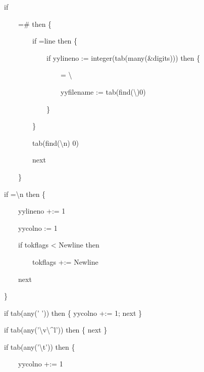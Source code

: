 {\ttfamily\mdseries
\ \ \ \ \ \ \ if }

{\ttfamily\mdseries
\ \ \ \ \ \ \ \ \ \ \ ={\textquotedbl}\#{\textquotedbl} then \{}

{\ttfamily\mdseries
\ \ \ \ \ \ \ \ \ \ \ \ \ \ \ if ={\textquotedbl}line {\textquotedbl} then \{}

{\ttfamily\mdseries
\ \ \ \ \ \ \ \ \ \ \ \ \ \ \ \ \ \ \ if yylineno := integer(tab(many(\&digits))) then \{}

{\ttfamily\mdseries
\ \ \ \ \ \ \ \ \ \ \ \ \ \ \ \ \ \ \ \ \ \ \ ={\textquotedbl} {\textbackslash}{\textquotedbl}{\textquotedbl}}

{\ttfamily\mdseries
\ \ \ \ \ \ \ \ \ \ \ \ \ \ \ \ \ \ \ \ \ \ \ yyfilename :=
tab(find({\textquotedbl}{\textbackslash}{\textquotedbl}{\textquotedbl}){\textbar}0)}

{\ttfamily\mdseries
\ \ \ \ \ \ \ \ \ \ \ \ \ \ \ \ \ \ \ \}}

{\ttfamily\mdseries
\ \ \ \ \ \ \ \ \ \ \ \ \ \ \ \}}

{\ttfamily\mdseries
\ \ \ \ \ \ \ \ \ \ \ \ \ \ \ tab(find({\textquotedbl}{\textbackslash}n{\textquotedbl}) {\textbar} 0)}

{\ttfamily\mdseries
\ \ \ \ \ \ \ \ \ \ \ \ \ \ \ next}

{\ttfamily\mdseries
\ \ \ \ \ \ \ \ \ \ \ \}}

{\ttfamily\mdseries
\ \ \ \ \ \ \ if ={\textquotedbl}{\textbackslash}n{\textquotedbl} then \{}

{\ttfamily\mdseries
\ \ \ \ \ \ \ \ \ \ \ yylineno +:= 1}

{\ttfamily\mdseries
\ \ \ \ \ \ \ \ \ \ \ yycolno := 1}

{\ttfamily\mdseries
\ \ \ \ \ \ \ \ \ \ \ if tokflags {\textless} Newline then}

{\ttfamily\mdseries
\ \ \ \ \ \ \ \ \ \ \ \ \ \ \ tokflags +:= Newline}

{\ttfamily\mdseries
\ \ \ \ \ \ \ \ \ \ \ next}

{\ttfamily\mdseries
\ \ \ \ \ \ \ \}}

{\ttfamily\mdseries
\ \ \ \ \ \ \ if tab(any(' ')) then \{ yycolno +:= 1; next \}}

{\ttfamily\mdseries
\ \ \ \ \ \ \ if tab(any('{\textbackslash}v{\textbackslash}\^{}l')) then \{ next \}}

{\ttfamily\mdseries
\ \ \ \ \ \ \ if tab(any('{\textbackslash}t')) then \{}

{\ttfamily\mdseries
\ \ \ \ \ \ \ \ \ \ \ yycolno +:= 1}

